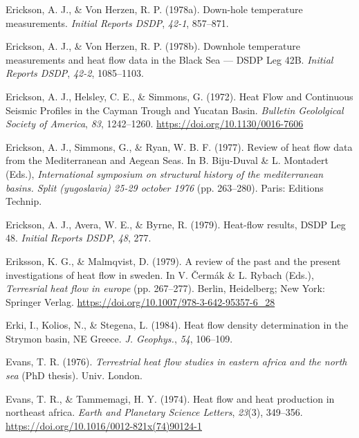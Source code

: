 \documentclass[draft,linenumbers]{agujournal2018}
\begin{document}
\leavevmode{}%
Erickson, A. J., \& Von Herzen, R. P. (1978a). Down-hole temperature
measurements. \emph{Initial Reports DSDP}, \emph{42-1}, 857--871.

\leavevmode{}%
Erickson, A. J., \& Von Herzen, R. P. (1978b). Downhole temperature
measurements and heat flow data in the {Black Sea} --- {DSDP Leg 42B}.
\emph{Initial Reports DSDP}, \emph{42-2}, 1085--1103.

\leavevmode{}%
Erickson, A. J., Helsley, C. E., \& Simmons, G. (1972). {Heat Flow and
Continuous Seismic Profiles in the Cayman Trough and Yucatan Basin}.
\emph{Bulletin Geololgical Society of America}, \emph{83}, 1242--1260.
\url{https://doi.org/10.1130/0016-7606}

\leavevmode{}%
Erickson, A. J., Simmons, G., \& Ryan, W. B. F. (1977). Review of heat
flow data from the {Mediterranean and Aegean Seas}. In B. Biju-Duval \&
L. Montadert (Eds.), \emph{International symposium on structural history
of the mediterranean basins. Split (yugoslavia) 25-29 october 1976} (pp.
263--280). Paris: Editions Technip.

\leavevmode{}%
Erickson, A. J., Avera, W. E., \& Byrne, R. (1979). Heat-flow results,
DSDP {Leg} 48. \emph{Initial Reports DSDP}, \emph{48}, 277.

\leavevmode{}%
Eriksson, K. G., \& Malmqvist, D. (1979). A review of the past and the
present investigations of heat flow in sweden. In V. Čermák \& L. Rybach
(Eds.), \emph{Terresrial heat flow in europe} (pp. 267--277). Berlin,
Heidelberg; New York: Springer Verlag.
\url{https://doi.org/10.1007/978-3-642-95357-6_28}

\leavevmode{}%
Erki, I., Kolios, N., \& Stegena, L. (1984). Heat flow density
determination in the {Strymon} basin, {NE Greece}. \emph{J. Geophys.},
\emph{54}, 106--109.

\leavevmode{}%
Evans, T. R. (1976). \emph{Terrestrial heat flow studies in eastern
africa and the north sea} (PhD thesis). Univ. London.

\leavevmode{}%
Evans, T. R., \& Tammemagi, H. Y. (1974). Heat flow and heat production
in northeast africa. \emph{Earth and Planetary Science Letters},
\emph{23}(3), 349--356.
\url{https://doi.org/10.1016/0012-821x(74)90124-1}
\end{document}
